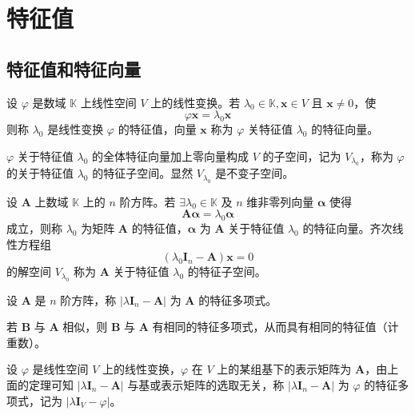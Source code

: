 \chapter{特征值}


\section{特征值和特征向量}

\begin{definition}
    设 $\varphi$ 是数域 $\mathbb{K}$ 上线性空间 $V$ 上的线性变换。若 $\lambda_0 \in \mathbb{K}, \bm{x} \in V$ 且 $\bm{x} \neq 0$，使
    \[
        \varphi\bm{x} = \lambda_{0}\bm{x}
    \]
    则称 $\lambda_0$ 是线性变换 $\varphi$ 的特征值，向量 $\bm{x}$ 称为 $\varphi$ 关特征值 $\lambda_0$ 的特征向量。
\end{definition}

\begin{remark}
    $\varphi$ 关于特征值 $\lambda_0$ 的全体特征向量加上零向量构成 $V$ 的子空间，记为 $V_{\lambda_{0}}$，称为 $\varphi$ 的关于特征值 $\lambda_0$ 的特征子空间。显然 $V_{\lambda_{0}}$ 是不变子空间。
\end{remark}

\begin{definition}
    设 $\bm{A}$ 上数域 $\mathbb{K}$ 上的 $n$ 阶方阵。若 $\exists \lambda_0 \in \mathbb{K}$ 及 $n$ 维非零列向量 $\bm{\alpha}$ 使得
    \[
        \bm{A\alpha} = \lambda_{0}\bm{\alpha}
    \]
    成立，则称 $\lambda_0$ 为矩阵 $\bm{A}$ 的特征值，$\bm{\alpha}$ 为 $\bm{A}$ 关于特征值 $\lambda_0$ 的特征向量。齐次线性方程组
    \[
        (\lambda_{0}\bm{I}_n - \bm{A})\bm{x} = 0
    \]
    的解空间 $V_{\lambda_{0}}$ 称为 $\bm{A}$ 关于特征值 $\lambda_0$ 的特征子空间。
\end{definition}

\begin{definition}
    设 $\bm{A}$ 是 $n$ 阶方阵，称 $\vert \lambda \bm{I}_n - \bm{A} \vert$ 为 $\bm{A}$ 的特征多项式。
\end{definition}

\begin{theorem}
    若 $\bm{B}$ 与 $\bm{A}$ 相似，则 $\bm{B}$ 与 $\bm{A}$ 有相同的特征多项式，从而具有相同的特征值（计重数）。
\end{theorem}

\begin{definition}
    设 $\varphi$ 是线性空间 $V$ 上的线性变换，$\varphi$ 在 $V$ 上的某组基下的表示矩阵为 $\bm{A}$，由上面的定理可知 $\left\vert \lambda \bm{I}_n - \bm{A} \right\vert$ 与基或表示矩阵的选取无关，称 $\left\vert \lambda \bm{I}_n - \bm{A} \right\vert$ 为 $\varphi$ 的特征多项式，记为 $\left\vert \lambda \bm{I}_V - \varphi \right\vert$。
\end{definition}


